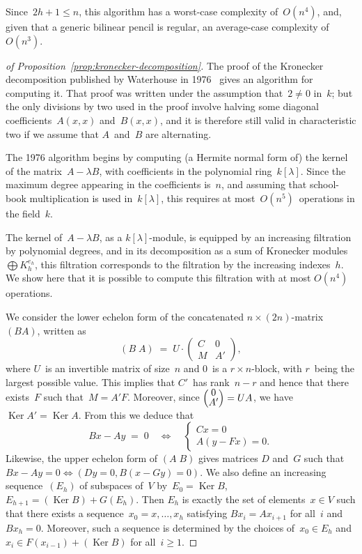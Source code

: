 \documentclass{lms}
\def\mat#1{\begin{pmatrix}#1\end{pmatrix}}
\def\smat{\def\arraystretch{.66}\mat}
\DeclareMathOperator\Ker{Ker}
\begin{document}
Since~$2h+1 ≤ n$, this algorithm has a worst-case complexity of~$O(n^4)$,
and, given that a generic bilinear pencil is regular,
an average-case complexity of~$O(n^3)$.

\begin{proof}[of Proposition~\ref{prop:kronecker-decomposition}]
The proof of the Kronecker decomposition published
by Waterhouse in 1976~\cite[Theorem 3.1]{inventiones1976waterhouse}
gives an algorithm for computing it.
That proof was written under the assumption that~$2 ≠ 0$ in~$k$;
but the only divisions by two used in the proof
involve halving some diagonal coefficients~$A(x,x)$ and~$B(x,x)$,
and it is therefore still valid in characteristic two
if we assume that $A$~and~$B$ are alternating.

\medbreak

The 1976 algorithm begins by computing (a Hermite normal form of)
the kernel of the matrix~$A - λ B$,
with coefficients in the polynomial ring~$k[λ]$.
Since the maximum degree appearing in the coefficients is~$n$,
and assuming that school-book multiplication is used in~$k[λ]$,
this requires at most~$O(n^5)$~operations in the field~$k$.

The kernel of~$A - λ B$, as a $k[λ]$-module,
is equipped by an increasing filtration by polynomial degrees,
and in its decomposition as a sum of Kronecker modules~$⨁ K_h^{e_h}$,
this filtration corresponds to the filtration by the increasing
indexes~$h$.
We show here that it is possible to compute this filtration
with at most $O(n^4)$ operations.

\medbreak

We consider the lower echelon form
of the concatenated $n × (2n)$-matrix $(B A)$, written as
\begin{equation}
(B \; A) \;=\; U · \mat{C & 0 \\ M & A'},
\end{equation}
where $U$~is an invertible matrix of size~$n$
and $0$~is a $r × n$-block, with $r$~being the largest possible value.
This implies that $C'$~has rank~$n-r$ and hence that
there exists~$F$ such that~$M = A' F$.
Moreover, since $\smat{0\\A'} = U A$, we have~$\Ker A' = \Ker A$.
From this we deduce that
\begin{equation}
B x - A y \;=\; 0 \quad ⇔ \quad
  \begin{cases} C x = 0 \\ A (y - F x) = 0.\end{cases}
\end{equation}
Likewise, the upper echelon form of $(A\;B)$
gives matrices $D$ and~$G$ such that
$B x - A y = 0 ⇔ (D y = 0, B (x - G y) = 0)$.
We also define an increasing sequence~$(E_h)$ of subspaces of~$V$
by~$E_0 = \Ker B$, $E_{h+1} = (\Ker B) + G(E_h)$.
Then $E_h$ is exactly the set of elements~$x ∈ V$ such that there exists
a sequence~$x_0 = x, …, x_h$ satisfying $B x_i = A x_{i+1}$ for all~$i$
and~$B x_h = 0$.
Moreover, such a sequence is determined by the choices
of~$x_0 ∈ E_h$ and~$x_{i} ∈ F(x_{i-1}) + (\Ker B)$ for all~$i ≥ 1$.


\end{proof}
\end{document}
